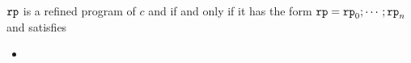 \begin{defn}
  \label{def:refined-prog}
  $\mathtt{rp}$  is a refined program of $c$ and if and only if it has the form $ \mathtt{rp} = \mathtt{rp}_0; \cdots; \mathtt{rp}_n$
  and  satisfies
  \begin{itemize}
  \item 

\end{itemize}
\end{defn}
